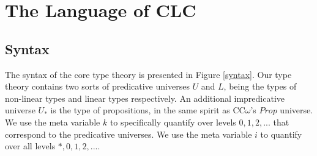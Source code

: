 \documentclass{article}
\theoremstyle{definition}
\begin{document}
  \section{The Language of CLC}
  \subsection{Syntax}
  The syntax of the core type theory is presented in Figure \ref{syntax}. Our type theory contains two sorts of predicative universes $U$ and $L$, being the types of non-linear types and linear types respectively. An additional impredicative universe $U_*$ is the type of propositions, in the same spirit as CC$\omega$'s $Prop$ universe. We use the meta variable $k$ to specifically quantify over levels $0, 1, 2, ...$ that correspond to the predicative universes. We use the meta variable $i$ to quantify over all levels $*, 0, 1, 2, ...$.
\end{document}
